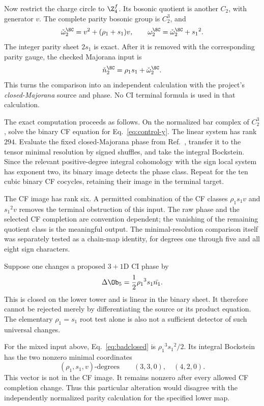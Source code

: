 Now restrict the charge circle to $\Z_4^f$. Its bosonic quotient is another $C_2$, with generator $v$. The complete parity bosonic group is $C_2^3$, and
\begin{equation}
\check\omega_2^{\SC}=v^2+({\rho_1}+{s_1})v,\qquad \omega_2^{\SC}=\check\omega_2^{\SC}+{s_1}^2.
\end{equation}
The integer parity sheet $2{s_1}$ is exact. After it is removed with the corresponding parity gauge, the checked Majorana input is
\begin{equation}\label{eq:control-y}
\check n_2^{\SC}={\rho_1}{s_1}+\check\omega_2^{\SC}.
\end{equation}
This turns the comparison into an independent calculation with the project's \emph{closed-Majorana} source and phase. No CI terminal formula is used in that calculation.

The exact computation proceeds as follows. On the normalized bar complex of $C_2^3$, solve the binary CF equation for Eq.~\eqref{eq:control-y}. The linear system has rank $294$. Evaluate the fixed closed-Majorana phase from Ref.~\cite{Project3}, transfer it to the tensor minimal resolution by signed shuffles, and take the integral Bockstein. Since the relevant positive-degree integral cohomology with the sign local system has exponent two, its binary image detects the phase class. Repeat for the ten cubic binary CF cocycles, retaining their image in the terminal target.

The CF image has rank six. A permitted combination of the CF classes ${\rho_1}{s_1}v$ and ${s_1}^2v$ removes the terminal obstruction of this input. The raw phase and the selected CF completion are convention dependent; the vanishing of the remaining quotient class is the meaningful output. The minimal-resolution comparison itself was separately tested as a chain-map identity, for degrees one through five and all eight sign characters.


Suppose one changes a proposed $3+1$D CI phase by
\begin{equation}\label{eq:badclosed}
\Delta\Ob_5=\frac12{\rho_1}^3{s_1}\bar {n_1}.
\end{equation}
This is closed on the lower tower and is linear in the binary sheet. It therefore cannot be rejected merely by differentiating the source or its product equation. The elementary ${\rho_1}={s_1}$ root test alone is also not a sufficient detector of such universal changes.

For the mixed input above, Eq.~\eqref{eq:badclosed} is ${\rho_1}^3{s_1}^2/2$. Its integral Bockstein has the two nonzero minimal coordinates
\begin{equation}
({\rho_1},{s_1},v)\text{-degrees}\qquad (3,3,0),\quad(4,2,0).
\end{equation}
This vector is not in the CF image. It remains nonzero after every allowed CF completion change. Thus this particular alteration would disagree with the independently normalized parity calculation for the specified lower map.

